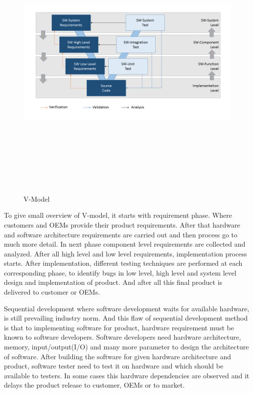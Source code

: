 \begin{figure}[h!]
\includegraphics[width=14cm, height=14cm]{./images/V-Model}
\centering
\caption{V-Model}
\label{fig:v-model}
\end{figure}


\par To give small overview of V-model, it starts with requirement phase. Where customers and OEMs provide their product requirements. After that hardware and software architecture requirements are carried out and then process go to much more detail. In next phase component level requirements are collected and analyzed. After all high level and low level requirements, implementation process starts. After implementation, different testing techniques are performed at each corresponding phase, to identify bugs in low level, high level and system level design and implementation of product. And after all this final product is delivered to customer or OEMs.

\par Sequential development where software development waits for available hardware, is still prevailing industry norm. And this flaw of sequential development method is that to implementing software for product, hardware requirement must be known to software developers. Software developers need hardware architecture, memory, input/output(I/O) and many more parameter to design the architecture of software. After building the software for given hardware architecture and product, software tester need to test it on hardware and which should be available to testers. In some cases this hardware dependencies are observed and it delays the product release to customer, OEMs or to market. 

